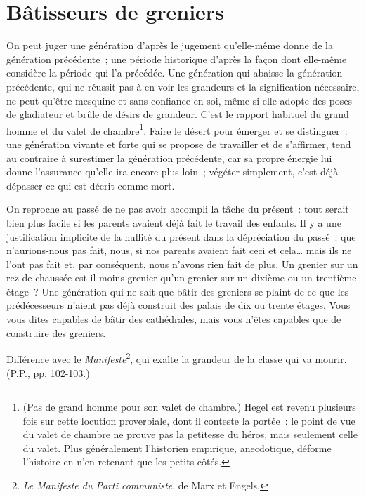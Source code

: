 \documentclass[french,twoside]{book} %
\begin{document}
\section[{Bâtisseurs de greniers}]{Bâtisseurs de greniers}
\noindent On peut juger une génération d’après le jugement qu’elle-même donne de la génération précédente ; une période historique d’après la façon dont elle-même considère la période qui l’a précédée. Une génération qui abaisse la génération précédente, qui ne réussit pas à en voir les grandeurs et la signification nécessaire, ne peut qu’être mesquine et sans confiance en soi, même si elle adopte des poses de gladiateur et brûle de désirs de grandeur. C'est le rapport habituel du grand homme et du valet de chambre\footnote{(Pas de grand homme pour son valet de chambre.) Hegel est revenu plusieurs fois sur cette locution proverbiale, dont il conteste la portée : le point de vue du valet de chambre ne prouve pas la petitesse du héros, mais seulement celle du valet. Plus généralement l’historien empirique, anecdotique, déforme l’histoire en n’en retenant que les petits côtés.}. Faire le désert pour émerger et se distinguer : une génération vivante et forte qui se propose de travailler et de s’affirmer, tend au contraire à surestimer la génération précédente, car sa propre énergie lui donne l’assurance qu’elle ira encore plus loin ; végéter simplement, c’est déjà dépasser ce qui est décrit comme mort.\par
On reproche au passé de ne pas avoir accompli la tâche du présent : tout serait bien plus facile si les parents avaient déjà fait le travail des enfants. Il y a une justification implicite de la nullité du présent dans la dépréciation du passé : que n’aurions-nous pas fait, nous, si nos parents avaient fait ceci et cela… mais ils ne l’ont pas fait et, par conséquent, nous n’avons rien fait de plus. Un grenier sur un rez-de-chaussée est-il moins grenier qu’un grenier sur un dixième ou un trentième étage ? Une génération qui ne sait que bâtir des greniers se plaint de ce que les prédécesseurs n’aient pas déjà construit des palais de dix ou trente étages. Vous vous dites capables de bâtir des cathédrales, mais vous n’êtes capables que de construire des greniers.\par
Différence avec le \emph{Manifeste}\footnote{\emph{Le Manifeste du Parti communiste}, de Marx et Engels.}, qui exalte la grandeur de la classe qui va mourir. (P.P., pp. 102-103.)\par
{\raggedleft \noindent [1931-1932]}
\end{document}
